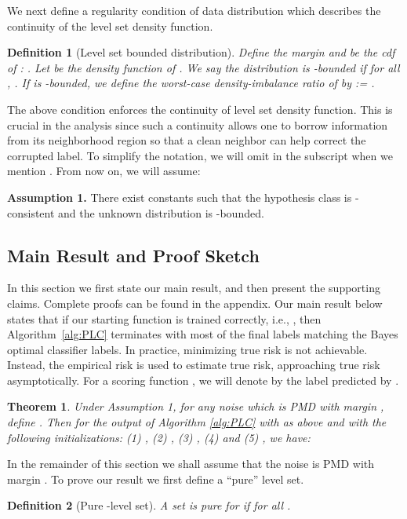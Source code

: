 \documentclass{article} \usepackage{iclr2021_conference,times}
\newtheorem{theorem}{Theorem}
\newtheorem{definition}{Definition}
\begin{document}
We next define a regularity condition of data distribution which describes the continuity of the level set density function.

 \begin{definition} [Level set bounded distribution] \label{leverlset_lip}
 Define the margin  and   be the cdf of : . Let  be the density function of . We say the distribution  is -bounded if for all , . If  is -bounded, we define the worst-case density-imbalance ratio of  by := .
 \end{definition}
 
The above condition enforces the continuity of level set density function. This is crucial in the analysis since such a continuity allows one to borrow information from its neighborhood region so that a clean neighbor can help correct the corrupted label. To simplify the notation, we will omit  in the subscript when we mention . From now on, we will assume:

\noindent\textbf{Assumption 1.} There exist constants  such that the hypothesis class  is  -consistent and the unknown distribution  is -bounded.

\subsection{Main Result and Proof Sketch}

In this section we first state our main result, and then present the supporting claims. Complete proofs can be found in the appendix. Our main result below states that if our starting function is trained correctly, i.e., , then Algorithm~\ref{alg:PLC} terminates with most of the final labels matching the Bayes optimal classifier labels. In practice, minimizing true risk is not achievable. Instead, the empirical risk is used to estimate true risk, approaching true risk asymptotically. For a scoring function , we will denote by  the label predicted by . 

\begin{theorem} \label{main}
Under Assumption 1, for any noise  which is PMD with margin , define . Then for the output of Algorithm \ref{alg:PLC}
 with  as above and with the following initializations: (1) , (2) , (3) , (4)  and (5)  , we have: 
\end{theorem}

In the remainder of this section we shall assume that the noise  is PMD with margin . To prove our result we first define a ``pure'' level set. 
 \begin{definition} [Pure -level set]
 A set  is pure for  if  for all . 
 \end{definition}
\end{document}
